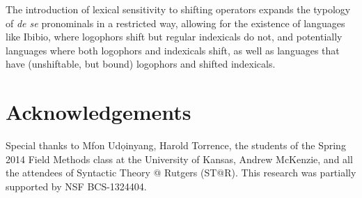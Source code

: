 \documentclass[output=paper]{langscibook}
\begin{document}
The introduction of lexical sensitivity to shifting operators expands the typology of \textit{de se} pronominals in a restricted way, allowing for the existence of languages like Ibibio, where logophors shift but regular indexicals do not, and potentially languages where both logophors and indexicals shift, as well as languages that have (unshiftable, but bound) logophors and shifted indexicals.


\section*{Acknowledgements}
Special thanks to Mfon Ud\d{o}inyang, Harold Torrence, the students of the Spring 2014 Field Methods class at the University of Kansas, Andrew McKenzie, and all the attendees of Syntactic Theory @ Rutgers (ST@R). This research was partially supported by NSF BCS-1324404.



{\sloppy \printbibliography[heading=subbibliography,notkeyword=this]}
\end{document}
